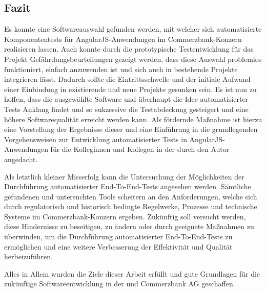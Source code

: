 \subsection{Fazit}
Es konnte eine Softwareauswahl gefunden werden, mit welcher sich automatisierte Komponententests für AngularJS-Anwendungen im Commerzbank-Konzern realisieren lassen. Auch konnte durch die prototypische Testentwicklung für das Projekt Gefährdungsbeurteilungen gezeigt werden, dass diese Auswahl problemlos funktioniert, einfach anzuwenden ist und sich auch in bestehende Projekte integrieren lässt. Dadurch sollte die Eintrittsschwelle und der initiale Aufwand einer Einbindung in existierende und neue Projekte gesunken sein. Es ist nun zu hoffen, dass die ausgewählte Software und überhaupt die Idee automatisierter Tests Anklang findet und so sukzessive die Testabdeckung gesteigert und eine höhere Softwarequalität erreicht werden kann. Als fördernde Maßnahme ist hierzu eine Vorstellung der Ergebnisse dieser \titleDocument{} und eine Einführung in die grundlegenden Vorgehensweisen zur Entwicklung automatisierter Tests in AngularJS-Anwendungen für die Kolleginnen und Kollegen in der \domain{} durch den Autor angedacht.

Als letztlich kleiner Misserfolg kann die Untersuchung der Möglichkeiten der Durchführung automatisierter End-To-End-Tests angesehen werden. Sämtliche gefundenen und untersuchten Tools scheitern an den Anforderungen, welche sich durch regulatorisch und historisch bedingte Regelwerke, Prozesse und technische Systeme im Commerzbank-Konzern ergeben. Zukünftig soll versucht werden, diese Hindernisse zu beseitigen, zu ändern oder durch geeignete Maßnahmen zu überwinden, um die Durchführung automatisierter End-To-End-Tests zu ermöglichen und eine weitere Verbesserung der Effektivität und Qualität herbeizuführen.

Alles in Allem wurden die Ziele dieser Arbeit erfüllt und gute Grundlagen für die zukünftige Softwareentwicklung in der \domain{} und Commerzbank AG geschaffen.
